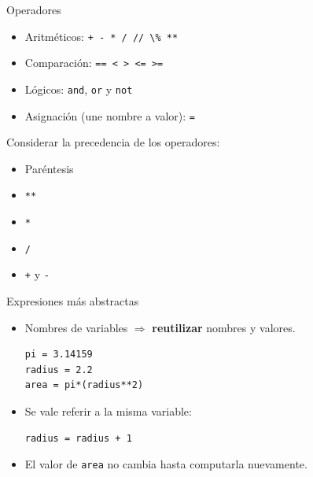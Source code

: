 \documentclass[mathserif]{beamer}
\begin{document}
\begin{frame}{Operadores}
    \begin{itemize}
        \item Aritméticos: \lstinline|+ - * / // \% **|
        \item Comparación: \lstinline|== < > <= >=|
        \item Lógicos: \lstinline|and|, \lstinline|or| y \lstinline|not|
        \item Asignación (une nombre a valor): \lstinline|=|
    \end{itemize}
    
    Considerar la precedencia de los operadores:
    \begin{itemize}
        \item Paréntesis
        \item \lstinline|**|
        \item \lstinline|*|
        \item \lstinline|/|
        \item \lstinline|+| y \lstinline|-|
    \end{itemize}
    
\end{frame}

\begin{frame}[fragile]{Expresiones más abstractas}
    \begin{itemize}
        \item Nombres de variables $\Rightarrow$ {\bfseries\blue reutilizar} nombres y valores.
\begin{lstlisting}
pi = 3.14159
radius = 2.2
area = pi*(radius**2)
\end{lstlisting}

        \item Se vale referir a la misma variable: 
\begin{lstlisting}
radius = radius + 1
\end{lstlisting}

        \item El valor de \lstinline|area| no cambia hasta computarla nuevamente.
    \end{itemize}
\end{frame}

\end{document}
